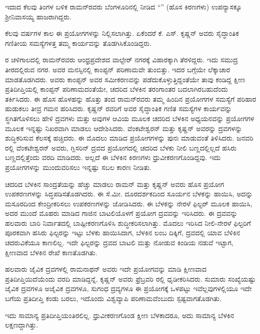 ಇದಾದ ಕೆಲವು ತಿಂಗಳ ಬಳಿಕ ರಾಮನ್‍ರವರು ಬೆಂಗಳೂರಿನಲ್ಲಿ ನೀಡಿದ “” (ಹೊಸ ಕಿರಣಗಳು) ಉಪನ್ಯಾಸಕ್ಕೂ ಶ‍್ರೀನಿವಾಸಯ್ಯ ಹಾಜರಾಗಿದ್ದರು.

ಕೆಲವು ವರ್ಷಗಳ ಕಾಲ ಈ ಪ್ರಯೋಗಗಳನ್ನು ನಿಲ್ಲಿಸಲಾಗಿತ್ತು. ಏಕೆಂದರೆ ಕೆ. ಎಸ್. ಕೃಷ್ಣನ್ ಅವರು ಸೈದ್ಧಾಂತಿಕ ಗಣಿತೀಯ ಸಮಸ್ಯೆಗಳತ್ತ ತಮ್ಮ ಕಾರ್ಯವನ್ನು ತೊಡಗಿಸಿಕೊಂಡಿದ್ದರು.

 ರ ಚಳಿಗಾಲದಲ್ಲಿ ರಾಮನ್‍ರವರು ಆಂಧ್ರಪ್ರದೇಶದ ವಾಲ್ಟೇರ್ ನಗರಕ್ಕೆ ವಿಹಾರಕ್ಕಾಗಿ ತೆರಳಿದ್ದರು. ಇದು ಸಮುದ್ರ ತೀರದಲ್ಲಿರುವ ನಗರ. ಅವರ ಮನಸ್ಸಿನಲ್ಲಿ ಕಾಂಪ್ಟನ್ ಪರಿಣಾಮವೇ ತುಂಬಿತ್ತು. ಇದರ ಬಗ್ಗೆಯೇ ಲೆಕ್ಕಾಚಾರ ಮಾಡತೊಡಗಿದರು. ಅವರು ಕಾಂಪ್ಟನ್ ಅವರ ಸಮೀಕರಣವನ್ನು ಪಡೆದುಕೊಳ್ಳುತ್ತಿದ್ದಂತೆಯೇ ತಾವು ಕಂಡಿದ್ದ ಕ್ಷೀಣ ಪ್ರತಿದೀಪ್ತಿಯಲ್ಲಿ ಕಾಂಪ್ಟನ್ ಪರಿಣಾಮದಂತೆಯೇ, ಚದರಿದ ಬೆಳಕಿನ ತರಂಗಾಂತರ ಬದಲಾಗಿರಬಹುದೆಂದು ತರ್ಕಿಸಿದರು. ಈ ಹೊಸ ಹೊಳಹನ್ನು ಹೊತ್ತು ತಂದ ರಾಮನ್‍ರವರು ತಮ್ಮ ಹಿಂದಿನ ಪ್ರಯೋಗಗಳ ಸಮಸ್ಯೆಗೆ ಪರಿಹಾರ ಹುಡುಕಲು ತೀವ್ರ ಗಮನ ಹರಿಸಿದರು. ಕೃಷ್ಣನ್ ರವರಿಗೆ ಅವರ ಸೈದ್ಧಾಂತಿಕ ಗಣಿತ ಸಮಸ್ಯೆಗಳ ಕಾರ್ಯವನ್ನು ಸ್ಥಗಿತಗೊಳಿಸಲು ಹೇಳಿ ದ್ರವಗಳು ಮತ್ತು ಅವುಗಳ ಆವಿಯ ಮೂಲಕ ಚದರಿದ ಬೆಳಕಿನ ಅಧ್ಯಯನವನ್ನು ಪ್ರಯೋಗಗಳ ಮೂಲಕ ಇನ್ನಷ್ಟು ನಿಖರವಾಗಿ ಮಾಡಲು ಆದೇಶಿಸಿದರು. ವೆಂಕಟೇಶ್ವರನ್ ಮತ್ತು ಕೃಷ್ಣನ್ ಅವರನ್ನು ದ್ರವಗಳನ್ನು ಶುದ್ಧಿಕರಿಸುವ ಕೆಲಸಕ್ಕೆ ಹಚ್ಚಿದರು. ಈ ಮೊದಲು ಮಾಡಿದ ಪ್ರಯೋಗಗಳನ್ನು ಪುನಃ ಮಾಡುವಂತೆ ತಿಳಿಸಿದರು. ಜನವರಿ ರಲ್ಲಿ ವೆಂಕಟೇಶ್ವರನ್ ಅವರು, ಗ್ಲಿಸರಿನ್ ದ್ರವದ ಪ್ರಯೋಗದಲ್ಲಿ ಚದರಿದ ಬೆಳಕು ನೀಲಿ ಬಣ್ಣದಲ್ಲಿಲ್ಲದೆ ಹಸಿರು ಬಣ್ಣದಲ್ಲಿತ್ತೆಂದು ವರದಿ ಮಾಡಿದರು. ಅಲ್ಲದೆ ಈ ಬೆಳಕಿನ ಕಿರಣಗಳು ಧ್ರುವೀಕರಣಗೊಂಡಿದ್ದವು. ಇದು ಪ್ರಯೋಗಗಳನ್ನು ಮುಂದುವರಿಸಲು ಇನ್ನಷ್ಟು ಸಬಲ ಕಾರಣ ನೀಡಿತು.

ಚದರಿದ ಬೆಳಕಿನ ಸಾಂದ್ರತೆಯನ್ನು ಹೆಚ್ಚು ಮಾಡಲು ರಾಮನ್ ಮತ್ತು ಕೃಷ್ಣನ್ ಅವರು ಹೊಸ ಪ್ರಯೋಗ ಉಪಕರಣಗಳನ್ನು ಸಿದ್ಧಪಡಿಸತೊಡಗಿದರು. ಈ ಸೆ.ಮೀ. ದೂರದರ್ಶಕದಿಂದ ಸೂರ್ಯನ ಬೆಳಕನ್ನು ಹಾಯಿಸಿ, ಅದನ್ನು ಮಸೂರದಿಂದ ಕೇಂದ್ರೀಕರಿಸಲು ಉಪಕರಣಗಳನ್ನು ಜೋಡಿಸಿದರು. ಈ ಬೆಳಕನ್ನು ನೇರಳೆ ಫಿಲ್ಟರ್ ಮೂಲಕ ಹಾಯಿಸಿ, ಅದರ ಮುಂದೆ ಮೊಹರು ಮಾಡಿದ ಗಾಜಿನ ಬಾಟಲಿಯೊಳಗೆ ಪ್ರಯೋಗ ದ್ರವವನ್ನು ಇರಿಸಿದರು. ಈ ದ್ರವವನ್ನು ಹಲವಾರು ಬಾರಿ ನಿರ್ವಾತದಲ್ಲಿ ಬಾಷ್ಪೀಕರಣಗೊಳಿಸಿ ಶುದ್ಧೀಕರಿಸಲಾಗಿತ್ತು. ಮೊದಲು ಇರಿಸಿದ ನೀಲಿ-ನೇರಳೆ ಫಿಲ್ಟರಿಗೆ ಪೂರಕವಾಗಿ ಹಸಿರು ಫಿಲ್ಟರನ್ನು ಇಟ್ಟು ಬೆಳಕು ಹಾಯಿಸಿದಾಗ, ಬೆಳಕಿನ ಲಂಬ ದಿಕ್ಕಿಗೆ, ದ್ರವದಲ್ಲಿ ಯಾವ ಬೆಳಿಕಿನ ಚದರುವಿಕೆಯೂ ಕಾಣಲಿಲ್ಲ. ಇದೇ ಫಿಲ್ಟರನ್ನು ದ್ರವದ ಬಾಟಲಿ ಮತ್ತು ನೋಡುವ ಕಿಂಡಿಯ ನಡುವೆ ಇಟ್ಟಾಗ, ಕ್ಷೀಣವಾದ ಬೆಳಕಿನ ರೇಖೆ ಕಾಣತೊಡಗಿತು.

ಹಲವಾರು ಜೈವಿಕ ದ್ರವಗಳಲ್ಲಿ ರಾಮನಾಥನ್ ಅವರು ಇದೇ ಪ್ರಯೋಗವನ್ನು ಮಾಡಿ ಕ್ಷೀಣವಾದ ಪ್ರತಿದೀಪ್ತಿಯಿದೆಯೆಂದು ವರದಿ ಮಾಡಿದ್ದನ್ನೆ, ಕೃಷ್ಣನ್ ಅವರು ಫ್ರೆಬ್ರವರಿ ರಲ್ಲಿ ಧೃಡೀಕರಿಸಿದರು. ಸುಮಾರು  ಸಂಖ್ಯೆಯಷ್ಟು ಜೈವಿಕ ದ್ರವಗಳೂ ಅಜೈವಿಕ ದ್ರವಗಳೂ, ಸುಗಂಧ ದ್ರವ್ಯಗಳೂ ಈ ಪ್ರಯೋಗಕ್ಕೆ ಒಳಪಟ್ಟು ಇವೆಲ್ಲವುಗಳಲ್ಲಿಯೂ ಇದೇ ಬಗೆಯ ಪ್ರತಿದೀಪ್ತಿ ಕಂಡು ಬರಲು, ಇದೊಂದು ವಿಶ್ವವ್ಯಾಪಿ ಪರಿಣಾಮವೆಂಬುದು ಸ್ಪಷ್ಟವಾಗತೊಡಗಿತು. 

ಇದು ಸಾಮಾನ್ಯ ಪ್ರತಿದೀಪ್ತಿಯಂತಿರಲಿಲ್ಲ. ಧ್ರುವೀಕರಣಗೊಂಡ ಕ್ಷೀಣ ಬೆಳಕಾದರೂ, ಅದು ಸಾಮಾನ್ಯ ಬೆಳಕಿನ ಲಕ್ಷಣದ್ದಾಗಿತ್ತು.


